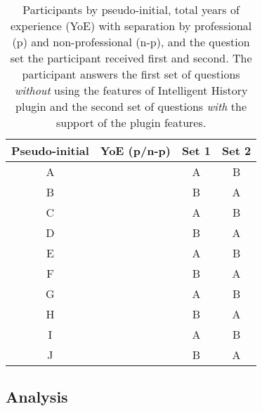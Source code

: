 \begin{table}[h]
  \centering
  \begin{tabular}{@{}clcc@{}}
    \toprule
    \multicolumn{1}{l}{Pseudo-initial} & YoE (p/n-p) & \multicolumn{1}{l}{Set 1} & \multicolumn{1}{l}{Set 2} \\ \midrule
    A                                  &             & A                                  & B                               \\
    B                                  &             & B                                  & A                               \\
    C                                  &             & A                                  & B                               \\
    D                                  &             & B                                  & A                               \\
    E                                  &             & A                                  & B                               \\
    F                                  &             & B                                  & A                               \\
    G                                  &             & A                                  & B                               \\
    H                                  &             & B                                  & A                               \\
    I                                  &             & A                                  & B                               \\
    J                                  &             & B                                  & A                               \\ \bottomrule
  \end{tabular}
  \caption{
    Participants by pseudo-initial, total years of experience (YoE) with separation by professional (p) and non-professional (n-p), and the question set the participant received first and second.
    The participant answers the first set of questions \emph{without} using the features of Intelligent History plugin and the second set of questions \emph{with} the support of the plugin features.
  }
  \label{tab:Participants}
\end{table}

\subsection{Analysis}

